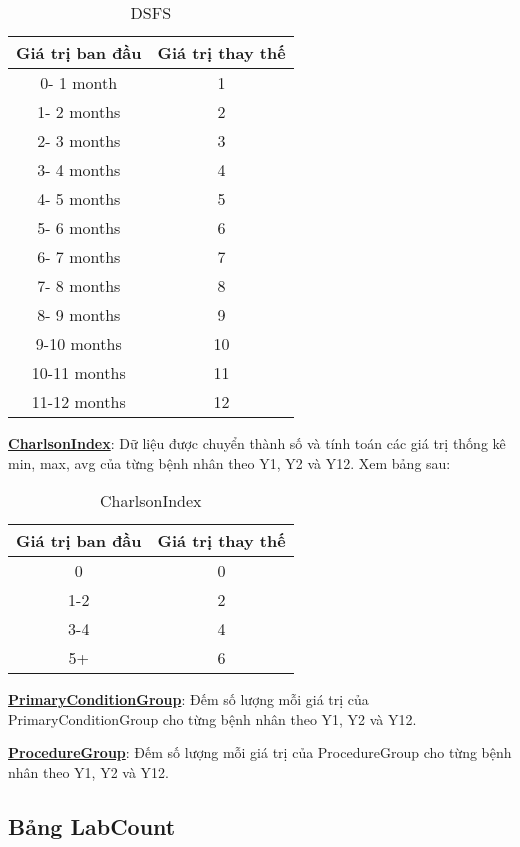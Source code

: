 \begin{table}[h!]
    \centering
    \begin{tabular}{||c c||} 
     \hline
     Giá trị ban đầu & Giá trị thay thế \\
     \hline\hline
     0- 1 month & 1 \\
     1- 2 months & 2 \\
     2- 3 months & 3 \\
     3- 4 months & 4 \\
     4- 5 months & 5 \\
     5- 6 months & 6 \\
     6- 7 months & 7 \\
     7- 8 months & 8 \\
     8- 9 months & 9 \\
     9-10 months & 10 \\
     10-11 months & 11 \\
     11-12 months & 12 \\
     \hline
    \end{tabular}
    \caption{DSFS}
    \label{table:1}
\end{table}

\textbf{\underline{CharlsonIndex}}: Dữ liệu được chuyển thành số và tính toán các giá trị thống kê min, max, avg của từng bệnh nhân theo Y1, Y2 và Y12. Xem bảng sau:

\begin{table}[h!]
    \centering
    \begin{tabular}{||c c||} 
     \hline
     Giá trị ban đầu & Giá trị thay thế \\
     \hline\hline
     0 & 0 \\
     1-2 & 2 \\
     3-4 & 4 \\
     5+ & 6 \\
     \hline
    \end{tabular}
    \caption{CharlsonIndex}
    \label{table:1}
\end{table}

\textbf{\underline{PrimaryConditionGroup}}: Đếm số lượng mỗi giá trị của PrimaryConditionGroup cho từng bệnh nhân theo Y1, Y2 và Y12.

\textbf{\underline{ProcedureGroup}}: Đếm số lượng mỗi giá trị của ProcedureGroup cho từng bệnh nhân theo Y1, Y2 và Y12.

\subsection{Bảng LabCount}

